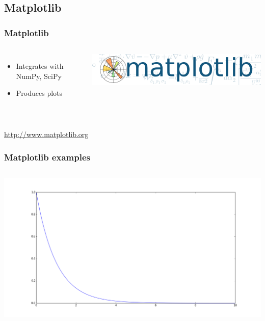 \documentclass[14pt]{beamer}
\begin{document}
\subsection{Matplotlib}
\begin{frame}
\frametitle{Matplotlib}
\begin{columns}
\begin{itemize}
\item Integrates with NumPy, SciPy
\item Produces plots
\end{itemize}
\includegraphics[width=\textwidth]{matplotlib_logo.png}
\end{columns}
~\\
\url{http://www.matplotlib.org}
\end{frame}

\begin{frame}
\frametitle{Matplotlib examples}
\begin{columns}

\includegraphics[width=\textwidth]{Matplotlib_basic.png}
\end{columns}
\end{frame}
\end{document}
